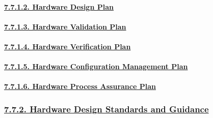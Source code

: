 \documentclass[
]{article}
\begin{document}
\hypertarget{hardware-design-plan}{%
\paragraph{\texorpdfstring{\protect\hyperlink{hardware-design-plan-1}{7.7.1.2.
Hardware Design
Plan}}{7.7.1.2. Hardware Design Plan}}\label{hardware-design-plan}}

\hypertarget{hardware-validation-plan}{%
\paragraph{\texorpdfstring{\protect\hyperlink{hardware-validation-plan-1}{7.7.1.3.
Hardware Validation
Plan}}{7.7.1.3. Hardware Validation Plan}}\label{hardware-validation-plan}}

\hypertarget{hardware-verification-plan}{%
\paragraph{\texorpdfstring{\protect\hyperlink{hardware-verification-plan-1}{7.7.1.4.
Hardware Verification
Plan}}{7.7.1.4. Hardware Verification Plan}}\label{hardware-verification-plan}}

\hypertarget{hardware-configuration-management-plan}{%
\paragraph{\texorpdfstring{\protect\hyperlink{hardware-configuration-management-plan-1}{7.7.1.5.
Hardware Configuration Management
Plan}}{7.7.1.5. Hardware Configuration Management Plan}}\label{hardware-configuration-management-plan}}

\hypertarget{hardware-process-assurance-plan}{%
\paragraph{\texorpdfstring{\protect\hyperlink{hardware-process-assurance-plan-1}{7.7.1.6.
Hardware Process Assurance
Plan}}{7.7.1.6. Hardware Process Assurance Plan}}\label{hardware-process-assurance-plan}}

\hypertarget{hardware-design-standards-and-guidance}{%
\subsubsection{\texorpdfstring{\protect\hyperlink{hardware-design-standards-and-guidance-1}{7.7.2.
Hardware Design Standards and
Guidance}}{7.7.2. Hardware Design Standards and Guidance}}\label{hardware-design-standards-and-guidance}}
\end{document}

